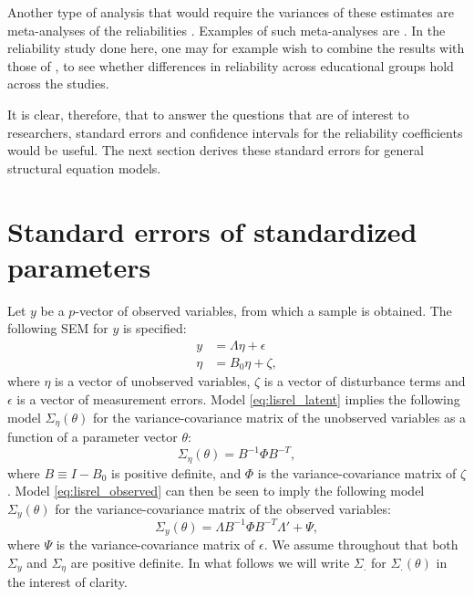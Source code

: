 \documentclass[a4paper, 11pt]{article}
\newcommand{\n}{\eta}
\newcommand{\definedas}{\equiv}
\newcommand{\0}{\boldsymbol{0}}
\begin{document}
Another type of analysis that would require the variances of these estimates are meta-analyses of the reliabilities \citep[261, 271-2]{cooper2009handbook}. Examples of such meta-analyses are 
\cite{andrews_construct_1984,scherpenzeel_validity_1997,saris_estimation_2007,alwin_margins_2007}. In the reliability study done 
here, one may for example wish to combine the results with those of \cite{lundberg1996assessing}, to see whether differences in 
reliability across educational groups hold across the studies.

It is clear, therefore, that to answer the questions that are of interest to  researchers, standard errors and confidence intervals for the 
reliability coefficients would be useful. The next section derives these standard errors for general structural equation models. 

\section{Standard errors of standardized parameters}

Let $y$ be a $p$-vector of observed variables, from which a sample is obtained.
The following SEM for $y$ is specified:
\begin{align}
\label{eq:lisrel_observed}
y &= \Lambda \n + \epsilon\\
\n &= B_0 \n + \zeta,\label{eq:lisrel_latent}
\end{align}
where $\n$ is a vector of unobserved variables, $\zeta$ is a vector of
disturbance terms and $\epsilon$ is a vector of measurement errors. Model
\ref{eq:lisrel_latent} implies the following model
$\Sigma_\n(\theta)$ for the variance-covariance matrix of the unobserved
variables as a function of a parameter vector $\theta$: 
\begin{equation}\label{eq:sigma_n}
    \Sigma_\n(\theta) = B^{-1} \Phi B^{-T},
\end{equation}
where $B \definedas I - B_0$ is positive definite, 
and $\Phi$ is the variance-covariance
matrix of $\zeta$. Model \ref{eq:lisrel_observed} can then be seen to imply the
following model $\Sigma_y(\theta)$ for the variance-covariance matrix of the
observed variables:
\begin{equation}\label{eq:sigma_y}
    \Sigma_y(\theta) = \Lambda B^{-1} \Phi B^{-T} \Lambda' + \Psi,
\end{equation}
where  $\Psi$ is the variance-covariance matrix of $\epsilon$. 
We assume throughout that both $\Sigma_y$ and $\Sigma_\n$ are positive
definite. In what follows we will write $\Sigma_.$ for $\Sigma_.(\theta)$ in
the interest of clarity.
\end{document}
